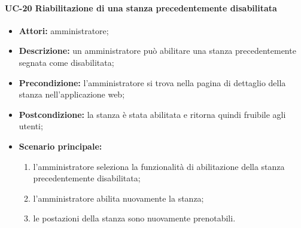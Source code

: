 \paragraph{UC-20 Riabilitazione di una stanza precedentemente disabilitata}
\begin{itemize}
    \item \textbf{Attori:} amministratore;
    \item \textbf{Descrizione:} un amministratore pu\`{o} abilitare una stanza precedentemente segnata come disabilitata;
    \item \textbf{Precondizione:} l'amministratore si trova nella pagina di dettaglio della stanza nell'applicazione web;
    \item \textbf{Postcondizione:} la stanza \`{e} stata abilitata e ritorna quindi fruibile agli utenti;
    \item \textbf{Scenario principale:}
    \begin{enumerate}
        \item l'amministratore seleziona la funzionalità di abilitazione della stanza precedentemente disabilitata;
        \item l'amministratore abilita nuovamente la stanza;
        \item le postazioni della stanza sono nuovamente prenotabili.
    \end{enumerate}
\end{itemize}